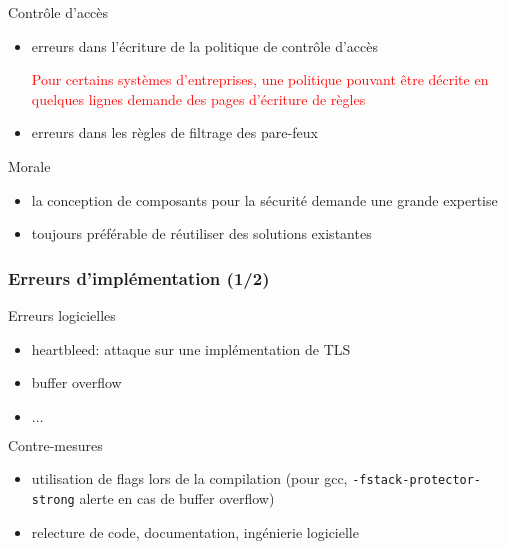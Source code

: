 \begin{reveals}
\begin{frame}
  \vfill

  \begin{block}{Contrôle d'accès}
    \begin{itemize}
    \item erreurs dans l'écriture de la politique de contrôle d'accès
      \begin{center}
        \textcolor{red}{Pour certains systèmes d'entreprises, une politique pouvant être décrite en quelques lignes demande des pages d'écriture de règles}
      \end{center}
    \item erreurs dans les règles de filtrage des pare-feux
    \end{itemize}
  \end{block}

\vfill

\begin{block}{Morale}
  \begin{itemize}
  \item la conception de composants pour la sécurité demande une
    grande expertise
  \item toujours préférable de réutiliser des solutions existantes
  \end{itemize}
\end{block}

\vfill
\end{frame}

\begin{frame}
  \frametitle{Erreurs d'implémentation (1/2)}

  \vfill

  \begin{block}{Erreurs logicielles}
    \begin{itemize}
    \item heartbleed: attaque sur une implémentation de TLS
    \item buffer overflow
    \item \(\ldots\)
    \end{itemize}
  \end{block}

  \vfill

  \begin{block}{Contre-mesures}
    \begin{itemize}
    \item utilisation de flags lors de la compilation (pour gcc,
      \texttt{-fstack-protector-strong} alerte en cas de buffer
      overflow)
    \item relecture de code, documentation, ingénierie logicielle
    \end{itemize}
  \end{block}


\end{frame}
\end{reveals}
